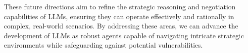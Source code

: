 These future directions aim to refine the strategic reasoning and negotiation capabilities of LLMs, ensuring they can operate effectively and rationally in complex, real-world scenarios. By addressing these areas, we can advance the development of LLMs as robust agents capable of navigating intricate strategic environments while safeguarding against potential vulnerabilities.
